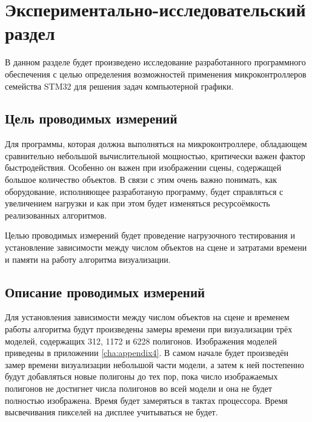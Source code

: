 \chapter{Экспериментально-исследовательский раздел}



В данном разделе будет произведено исследование разработанного программного обеспечения с целью определения возможностей применения 
микроконтроллеров семейства STM32 для решения задач компьютерной графики.

\section{Цель проводимых измерений}
Для программы, которая должна выполняться на микроконтроллере, обладающем сравнительно небольшой вычислительной мощностью, критически 
важен фактор быстродействия. Особенно он важен при изображении сцены, содержащей большое количество объектов. В связи с этим очень 
важно понимать, как оборудование, исполняющее разработаную программу, будет справляться с увеличением нагрузки и как при этом 
будет изменяться ресурсоёмкость реализованных алгоритмов.

Целью проводимых измерений будет проведение нагрузочного тестирования и установление зависимости между числом объектов на сцене и затратами 
времени и памяти на работу алгоритма визуализации.



\section{Описание проводимых измерений}
Для установления зависимости между числом объектов на сцене и временем работы алгоритма будут произведены замеры времени при 
визуализации трёх моделей, содержащих 312, 1172 и 6228 полигонов. Изображения моделей приведены в приложении \ref{cha:appendix4}. 
В самом начале будет произведён замер времени визуализации небольшой части модели, а затем к ней постепенно будут добавляться 
новые полигоны до тех пор, пока число изображаемых полигонов не достигнет числа полигонов во всей модели и она не будет 
полностью изображена. Время будет замеряться в тактах процессора. Время высвечивания пикселей на дисплее учитываться не будет.

